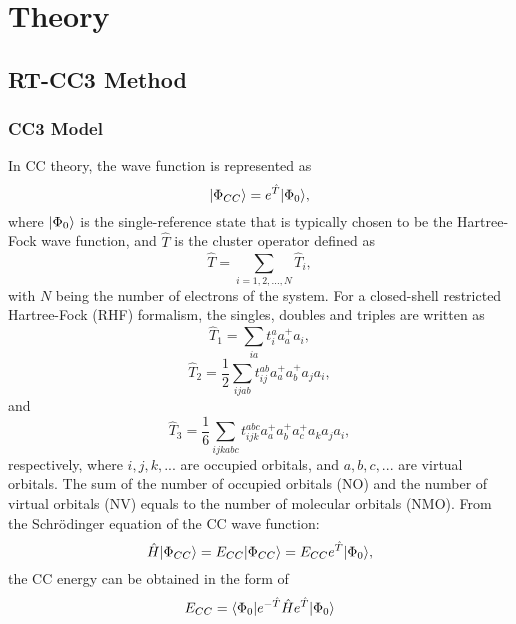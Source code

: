 \section{Theory} \label{theory_cc3} 
\subsection{RT-CC3 Method} \label{theory-cc3-1}
\subsubsection{CC3 Model}  \label{theory-cc3-11}
In CC theory, the wave function is represented as 
\begin{equation}
| \Phi_{CC} \rangle=e^{\hat{T}}| \Phi_{0} \rangle,
\end{equation}
where $| \Phi_{0} \rangle$ is the single-reference state that is typically chosen to be the Hartree-Fock wave function, and $\hat{T}$ is the cluster operator defined as
\begin{equation}
\hat{T} = \sum_{i=1, 2, ..., N}\hat{T}_{i},
\label{eq:cc3-t}
\end{equation}
with $N$ being the number of electrons of the system. For a closed-shell restricted Hartree-Fock (RHF) formalism, the singles, doubles and triples are written as
\begin{equation}
\hat{T}_{1}=\sum_{ia}t_{i}^{a}a_{a}^{+}a_{i},
\label{eq:cc3-T1}
\end{equation}
\begin{equation}
\hat{T}_{2}=\frac{1}{2}\sum_{ijab}t_{ij}^{ab}a_{a}^{+}a_{b}^{+}a_{j}a_{i},
\label{eq:cc3-T2}
\end{equation}
and
\begin{equation}
\hat{T}_{3}=\frac{1}{6}\sum_{ijkabc}t_{ijk}^{abc}a_{a}^{+}a_{b}^{+}a_{c}^{+}a_{k}a_{j}a_{i},
\label{eq:cc3-T3}
\end{equation}
respectively, where $i, j, k, ...$ are occupied orbitals, and $a, b, c, ...$ are virtual orbitals. The sum of the number of occupied orbitals (NO) and the number of virtual orbitals (NV) equals to the number of molecular orbitals (NMO). From the Schr\"odinger equation of the CC wave function:
\begin{equation}
\hat{H}| \Phi_{CC} \rangle=E_{CC}| \Phi_{CC} \rangle=E_{CC}e^{\hat{T}}| \Phi_{0} \rangle,
\end{equation}
the CC energy can be obtained in the form of
\begin{equation}
E_{CC} = \langle\Phi_{0} |e^{-\hat{T}}\hat{H}e^{\hat{T}}| \Phi_{0} \rangle
\label{eq:cc3-ecc}
\end{equation}
